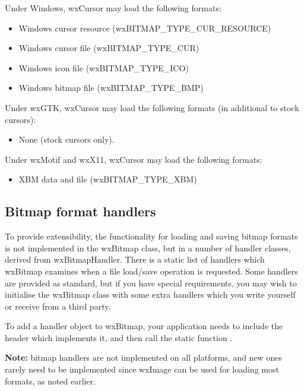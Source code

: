 
Under Windows, wxCursor may load the following formats:

\begin{itemize}\itemsep=0pt
\item Windows cursor resource (wxBITMAP\_TYPE\_CUR\_RESOURCE)
\item Windows cursor file (wxBITMAP\_TYPE\_CUR)
\item Windows icon file (wxBITMAP\_TYPE\_ICO)
\item Windows bitmap file (wxBITMAP\_TYPE\_BMP)
\end{itemize}

Under wxGTK, wxCursor may load the following formats (in additional
to stock cursors):

\begin{itemize}\itemsep=0pt
\item None (stock cursors only).
\end{itemize}

Under wxMotif and wxX11, wxCursor may load the following formats:

\begin{itemize}\itemsep=0pt
\item XBM data and file (wxBITMAP\_TYPE\_XBM)
\end{itemize}

\subsection{Bitmap format handlers}\label{bitmaphandlers}

To provide extensibility, the functionality for loading and saving bitmap formats
is not implemented in the wxBitmap class, but in a number of handler classes,
derived from wxBitmapHandler. There is a static list of handlers which wxBitmap
examines when a file load/save operation is requested. Some handlers are provided as standard, but if you
have special requirements, you may wish to initialise the wxBitmap class with
some extra handlers which you write yourself or receive from a third party.

To add a handler object to wxBitmap, your application needs to include the header which implements it, and
then call the static function .

{\bf Note:} bitmap handlers are not implemented on all platforms, and new ones rarely need
to be implemented since wxImage can be used for loading most formats, as noted earlier.

